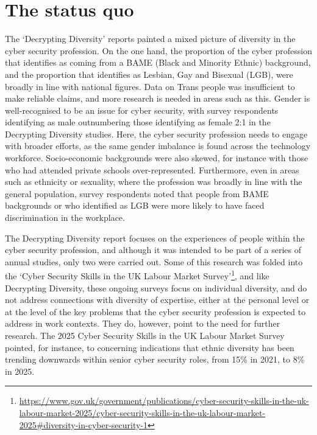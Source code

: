 \documentclass[
  a4paper,
]{book}
\begin{document}
\section{The status quo}\label{the-status-quo}

The `Decrypting Diversity' reports painted a mixed picture of diversity
in the cyber security profession. On the one hand, the proportion of the
cyber profession that identifies as coming from a BAME (Black and
Minority Ethnic) background, and the proportion that identifies as
Lesbian, Gay and Bisexual (LGB), were broadly in line with national
figures. Data on Trans people was insufficient to make reliable claims,
and more research is needed in areas such as this. Gender is
well-recognised to be an issue for cyber security, with survey
respondents identifying as male outnumbering those identifying as female
2:1 in the Decrypting Diversity studies. Here, the cyber security
profession needs to engage with broader efforts, as the same gender
imbalance is found across the technology workforce. Socio-economic
backgrounds were also skewed, for instance with those who had attended
private schools over-represented. Furthermore, even in areas such as
ethnicity or sexuality, where the profession was broadly in line with
the general population, survey respondents noted that people from BAME
backgrounds or who identified as LGB were more likely to have faced
discrimination in the workplace.

The Decrypting Diversity report focuses on the experiences of people
within the cyber security profession, and although it was intended to be
part of a series of annual studies, only two were carried out. Some of
this research was folded into the `Cyber Security Skills in the UK
Labour Market Survey'\footnote{\url{https://www.gov.uk/government/publications/cyber-security-skills-in-the-uk-labour-market-2025/cyber-security-skills-in-the-uk-labour-market-2025\#diversity-in-cyber-security-1}},
and like Decrypting Diversity, these ongoing surveys focus on individual
diversity, and do not address connections with diversity of expertise,
either at the personal level or at the level of the key problems that
the cyber security profession is expected to address in work contexts.
They do, however, point to the need for further research. The 2025 Cyber
Security Skills in the UK Labour Market Survey pointed, for instance, to
concerning indications that ethnic diversity has been trending downwards
within senior cyber security roles, from 15\% in 2021, to 8\% in 2025.
\end{document}
